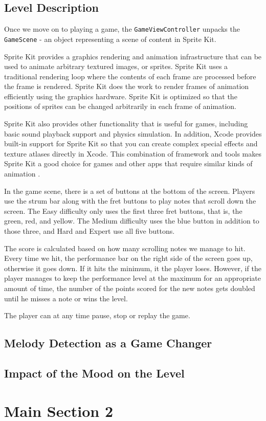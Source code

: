 \vspace{10pt}

\subsection{Level Description}

Once we move on to playing a game, the \verb|GameViewController| unpacks the \verb|GameScene| - an object representing a scene of content in Sprite Kit.

Sprite Kit provides a graphics rendering and animation infrastructure that can be used to animate arbitrary textured images, or sprites. Sprite Kit uses a traditional rendering loop where the contents of each frame are processed before the frame is rendered. Sprite Kit does the work to render frames of animation efficiently using the graphics hardware. Sprite Kit is optimized so that the positions of sprites can be changed arbitrarily in each frame of animation.

Sprite Kit also provides other functionality that is useful for games, including basic sound playback support and physics simulation. In addition, Xcode provides built-in support for Sprite Kit so that you can create complex special effects and texture atlases directly in Xcode. This combination of framework and tools makes Sprite Kit a good choice for games and other apps that require similar kinds of animation \cite{spritekit}. 

In the game scene, there is a set of buttons at the bottom of the screen. Players use the strum bar along with the fret buttons to play notes that scroll down the screen. The Easy difficulty only uses the first three fret buttons, that is, the green, red, and yellow. The Medium difficulty uses the blue button in addition to those three, and Hard and Expert use all five buttons.

The score is calculated based on how many scrolling notes we manage to hit. Every time we hit, the performance bar on the right side of the screen goes up, otherwise it goes down. If it hits the minimum, it the player loses. However, if the player manages to keep the performance level at the maximum for an appropriate amount of time, the number of the points scored for the new notes gets doubled until he misses a note or wins the level.

The player can at any time pause, stop or replay the game. 

\vspace{10pt}

\subsection{Melody Detection as a Game Changer}

\vspace{10pt}

\subsection{Impact of the Mood on the Level}

\vspace{20pt}


\section{Main Section 2}
